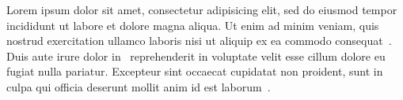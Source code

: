 \documentclass[a4paper,12pt]{article}
\begin{document}
Lorem ipsum dolor sit amet, consectetur adipisicing elit, sed do
eiusmod tempor incididunt ut labore et dolore magna aliqua. Ut enim ad
minim veniam, quis nostrud exercitation ullamco laboris nisi ut
aliquip ex ea commodo consequat~\cite{fart}. Duis aute irure dolor in~\cite{batlas}
reprehenderit in voluptate velit esse cillum dolore eu fugiat nulla
pariatur. Excepteur sint occaecat cupidatat non proident, sunt in
culpa qui officia deserunt mollit anim id est laborum~\cite{art}.

% 


\printbibliography[sorting=nyt]
\end{document}
